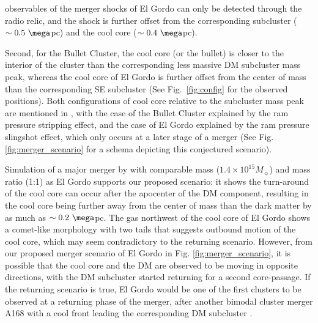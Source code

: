 observables of the merger shocks of El Gordo can only be detected through the radio relic, and the shock is
further offset from the corresponding subcluster ($\sim 0.5~\mega$pc) and
the cool core ($\sim 0.4~\mega$pc). \par
Second, for the Bullet Cluster, the cool core (or the bullet) is closer to the
interior of the cluster than the corresponding less massive DM subcluster mass
peak, whereas the cool core of El Gordo is further offset from the center of
mass than the corresponding SE subcluster (See Fig.~\ref{fig:config} for
the observed positions). 
Both configurations of cool core relative to the subcluster mass peak are
mentioned in \cite{Markevitch2007}, with the case of the Bullet Cluster
explained by the ram pressure stripping effect, and the case of El Gordo
explained by the ram pressure slingshot effect, which only occurs at a
later stage of a merger (See Fig. \ref{fig:merger_scenario} for a schema depicting this conjectured scenario).\par 
Simulation of a major merger by
\cite{Mathis05} with comparable mass ($1.4 \times 10^{15} M_{\sun}$) and
mass ratio (1:1) as El Gordo supports
our proposed scenario: it shows the turn-around of the cool core can occur after the
apocenter of the DM component, resulting in the cool core being further
away from the center of mass than the dark matter by as much as $\sim
0.2~\mega$pc.  The gas northwest of the cool core of El Gordo shows a comet-like
morphology with two tails that suggests outbound motion of the cool core, which may seem
contradictory to the returning scenario. However, from our proposed merger
scenario of El Gordo in Fig. \ref{fig:merger_scenario},
it is possible that the cool core and the DM are observed to be moving in
opposite directions, with the DM subcluster started returning for a second core-passage. If the returning scenario is true, El Gordo would be one of the first
clusters to be observed at a returning phase of the merger, after another
bimodal cluster merger A168 with a cool front leading the corresponding DM
subcluster \citep{Hallman04}.

